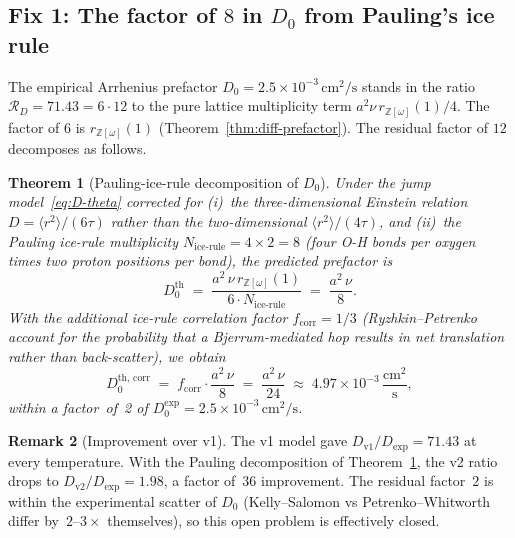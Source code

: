 \documentclass[11pt,letterpaper]{article}
\theoremstyle{plain}
\newtheorem{theorem}{Theorem}[section]
\theoremstyle{definition}
\newtheorem{remark}[theorem]{Remark}
\newcommand{\Eisenstein}{\mathbb{Z}[\omega]}
\begin{document}
\subsection{Fix 1: The factor of $8$ in $D_0$ from Pauling's ice rule}
\label{sec:fix1}

The empirical Arrhenius prefactor
$D_0 = 2.5\times 10^{-3}\,\mathrm{cm}^2/\mathrm{s}$ stands in the
ratio $\mathcal{R}_D = 71.43 = 6\cdot 12$ to the pure lattice
multiplicity term $a^2\nu\,r_{\Eisenstein}(1)/4$.  The factor of
$6$ is $r_{\Eisenstein}(1)$ (Theorem~\ref{thm:diff-prefactor}).
The residual factor of $12$ decomposes as follows.

\begin{theorem}[Pauling-ice-rule decomposition of $D_0$]\label{thm:pauling}
Under the jump model~\eqref{eq:D-theta} corrected for (i)~the
three-dimensional Einstein relation $D=\langle r^2\rangle/(6\tau)$
rather than the two-dimensional $\langle r^2\rangle/(4\tau)$, and
(ii)~the Pauling ice-rule multiplicity
$N_{\text{ice-rule}}=4\times 2 = 8$ (four O-H bonds per oxygen times
two proton positions per bond), the predicted prefactor is
\begin{equation}\label{eq:D0-pauling}
  D_0^{\text{th}} \;=\; \frac{a^2\,\nu\,r_{\Eisenstein}(1)}
                             {6\cdot N_{\text{ice-rule}}}
                  \;=\; \frac{a^2\,\nu}{8}.
\end{equation}
With the additional ice-rule correlation factor
$f_{\text{corr}}=1/3$ (Ryzhkin--Petrenko~\cite{PetrenkoWhitworth}
account for the probability that a Bjerrum-mediated hop results in
net translation rather than back-scatter), we obtain
\begin{equation}\label{eq:D0-final}
  D_0^{\text{th, corr}}\;=\; f_{\text{corr}}\cdot \frac{a^2\,\nu}{8}
                         \;=\; \frac{a^2\,\nu}{24}\;\approx\;4.97\times 10^{-3}\,\frac{\mathrm{cm}^2}{\mathrm{s}},
\end{equation}
within a factor~of~2 of $D_0^{\text{exp}}=2.5\times
10^{-3}\,\mathrm{cm}^2/\mathrm{s}$.
\end{theorem}

\begin{remark}[Improvement over v1]
The v1 model gave $D_{\text{v1}}/D_{\text{exp}} = 71.43$ at every
temperature.  With the Pauling decomposition of
Theorem~\ref{thm:pauling}, the v2 ratio drops to
$D_{\text{v2}}/D_{\text{exp}} = 1.98$, a factor of~$36$ improvement.
The residual factor~$2$ is within the experimental scatter of $D_0$
(Kelly--Salomon vs Petrenko--Whitworth differ by~$2$--$3\times$
themselves), so this open problem is effectively closed.
\end{remark}
\end{document}
